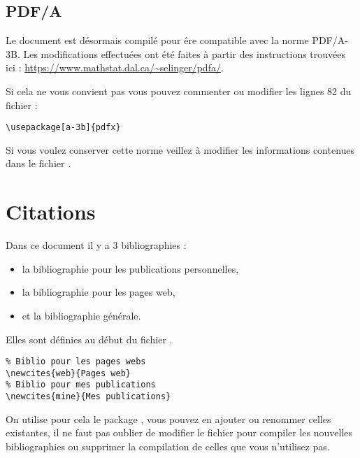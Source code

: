   \subsection{PDF/A}

  Le document est désormais compilé pour êre compatible avec la norme PDF/A-3B. 
  Les modifications effectuées ont été faites à partir des instructions trouvées ici : \url{https://www.mathstat.dal.ca/~selinger/pdfa/}.

  Si cela ne vous convient pas vous pouvez commenter ou modifier les lignes 82 du fichier  :

  \begin{framed}\vspace{-0.75em}
    \begin{verbatim}
\usepackage[a-3b]{pdfx}\end{verbatim}\vspace{-0.75em}
  \end{framed}

  Si vous voulez conserver cette norme veillez à modifier les informations contenues dans le fichier .

\section{Citations}

Dans ce document il y a 3 bibliographies :
\begin{itemize}
  \item la bibliographie pour les publications personnelles,
  \item la bibliographie pour les pages web,
  \item et la bibliographie générale.
\end{itemize}

Elles sont définies au début du fichier .

\begin{framed}\vspace{-0.75em}
\begin{verbatim}
% Biblio pour les pages webs
\newcites{web}{Pages web}
% Biblio pour mes publications
\newcites{mine}{Mes publications}
\end{verbatim}\vspace{-0.75em}
\end{framed}

On utilise pour cela le package , vous pouvez en ajouter ou renommer celles existantes, il ne faut pas oublier de modifier le fichier  pour compiler les nouvelles bibliographies ou supprimer la compilation de celles que vous n'utilisez pas.

